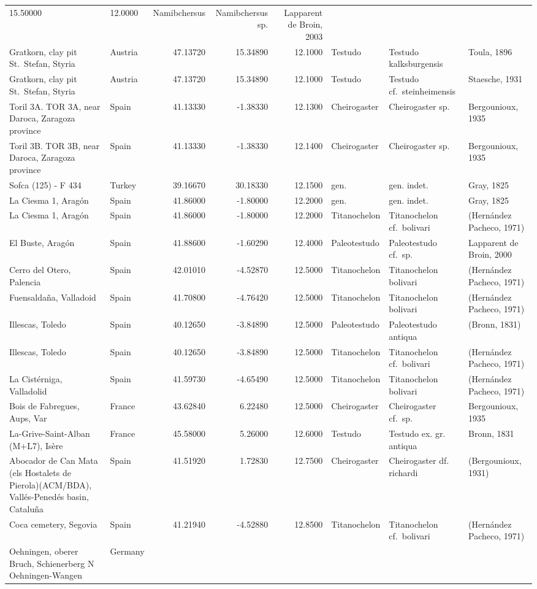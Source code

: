 \documentclass[]{article}
\begin{document}
\begin{longtable}[]{@{}llrrrlll@{}}
15.50000 & 12.0000 & Namibchersus & Namibchersus sp. & Lapparent de
Broin, 2003\tabularnewline
Gratkorn, clay pit St.~Stefan, Styria & Austria & 47.13720 & 15.34890 &
12.1000 & Testudo & Testudo kalksburgensis & Toula, 1896\tabularnewline
Gratkorn, clay pit St.~Stefan, Styria & Austria & 47.13720 & 15.34890 &
12.1000 & Testudo & Testudo cf.~steinheimensis & Staesche,
1931\tabularnewline
Toril 3A. TOR 3A, near Daroca, Zaragoza province & Spain & 41.13330 &
-1.38330 & 12.1300 & Cheirogaster & Cheirogaster sp. & Bergounioux,
1935\tabularnewline
Toril 3B. TOR 3B, near Daroca, Zaragoza province & Spain & 41.13330 &
-1.38330 & 12.1400 & Cheirogaster & Cheirogaster sp. & Bergounioux,
1935\tabularnewline
Sofca (125) - F 434 & Turkey & 39.16670 & 30.18330 & 12.1500 & gen. &
gen. indet. & Gray, 1825\tabularnewline
La Ciesma 1, Aragón & Spain & 41.86000 & -1.80000 & 12.2000 & gen. &
gen. indet. & Gray, 1825\tabularnewline
La Ciesma 1, Aragón & Spain & 41.86000 & -1.80000 & 12.2000 &
Titanochelon & Titanochelon cf.~bolivari & (Hernández Pacheco,
1971)\tabularnewline
El Buste, Aragón & Spain & 41.88600 & -1.60290 & 12.4000 & Paleotestudo
& Paleotestudo cf.~sp. & Lapparent de Broin, 2000\tabularnewline
Cerro del Otero, Palencia & Spain & 42.01010 & -4.52870 & 12.5000 &
Titanochelon & Titanochelon bolivari & (Hernández Pacheco,
1971)\tabularnewline
Fuensaldaña, Valladoid & Spain & 41.70800 & -4.76420 & 12.5000 &
Titanochelon & Titanochelon bolivari & (Hernández Pacheco,
1971)\tabularnewline
Illescas, Toledo & Spain & 40.12650 & -3.84890 & 12.5000 & Paleotestudo
& Paleotestudo antiqua & (Bronn, 1831)\tabularnewline
Illescas, Toledo & Spain & 40.12650 & -3.84890 & 12.5000 & Titanochelon
& Titanochelon cf.~bolivari & (Hernández Pacheco, 1971)\tabularnewline
La Cistérniga, Valladolid & Spain & 41.59730 & -4.65490 & 12.5000 &
Titanochelon & Titanochelon bolivari & (Hernández Pacheco,
1971)\tabularnewline
Bois de Fabregues, Aups, Var & France & 43.62840 & 6.22480 & 12.5000 &
Cheirogaster & Cheirogaster cf.~sp. & Bergounioux, 1935\tabularnewline
La-Grive-Saint-Alban (M+L7), Isère & France & 45.58000 & 5.26000 &
12.6000 & Testudo & Testudo ex. gr. antiqua & Bronn, 1831\tabularnewline
Abocador de Can Mata (els Hostalets de Pierola)(ACM/BDA), Vallés-Penedés
basin, Cataluña & Spain & 41.51920 & 1.72830 & 12.7500 & Cheirogaster &
Cheirogaster df. richardi & (Bergounioux, 1931)\tabularnewline
Coca cemetery, Segovia & Spain & 41.21940 & -4.52880 & 12.8500 &
Titanochelon & Titanochelon cf.~bolivari & (Hernández Pacheco,
1971)\tabularnewline
Oehningen, oberer Bruch, Schienerberg N Oehningen-Wangen & Germany &

\end{longtable}
\end{document}
